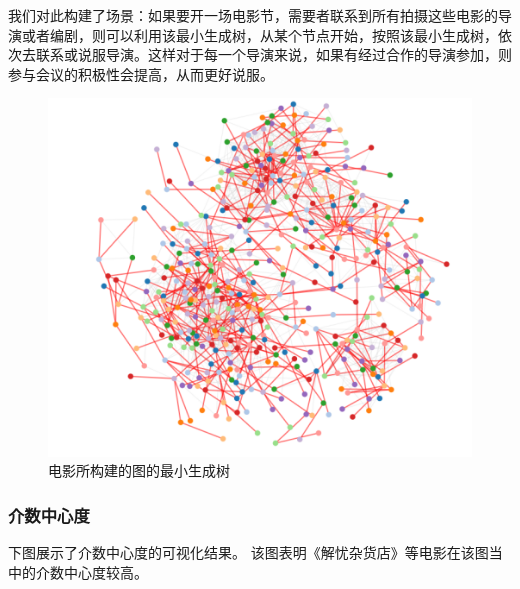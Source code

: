 \documentclass[UTF8, onecolumn, a4paper]{article}
\begin{document}
    我们对此构建了场景：如果要开一场电影节，需要者联系到所有拍摄这些电影的导演或者编剧，则可以利用该最小生成树，从某个节点开始，按照该最小生成树，依次去联系或说服导演。这样对于每一个导演来说，如果有经过合作的导演参加，则参与会议的积极性会提高，从而更好说服。
\begin{figure}[H]
	\centering
	\includegraphics[width=0.6\linewidth]{../pictures/show10}
	\caption{电影所构建的图的最小生成树}
\end{figure}
\subsubsection{介数中心度}
    下图展示了介数中心度的可视化结果。 该图表明《解忧杂货店》等电影在该图当中的介数中心度较高。
    
\end{document}
